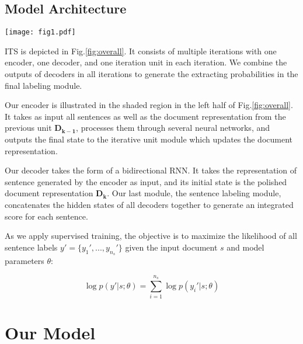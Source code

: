\documentclass[11pt,a4paper]{article}
\begin{document}
\subsection{Model Architecture}

\begin{figure*}
	\setlength{\abovecaptionskip}{0.cm}
	
	\setlength{\belowcaptionskip}{-0.cm}
	\texttt{[image: fig1.pdf]}
	\caption{\label{fig:overall} Model Structure: There is one encoder, one decoder and one iterative unit  (which is used to polish document representation) in each iteration. The final labeling part is used to generating the extracting probabilities for all sentences combining hidden states of decoders in all iterations. We take a document consists of three sentences for example here. }
\end{figure*}

ITS is depicted in Fig.\ref{fig:overall}. It consists of multiple iterations with one encoder, one decoder, and one iteration unit in each iteration. We combine the outputs of decoders in all iterations to generate the extracting probabilities in the final labeling module.

Our encoder is illustrated in the shaded region in the left half of Fig.\ref{fig:overall}. It takes as input all sentences as well as the document representation from the previous unit $\bm{D_{k-1}}$, processes them through several neural networks, and outputs the final state to the iterative unit module which updates the document representation. 

Our decoder takes the form of a bidirectional RNN. It takes the representation of sentence generated by the encoder as input, and its initial state is the polished document representation $\bm{D_{k}}$. 
Our last module, the sentence labeling module, concatenates the hidden states of all decoders together to generate an integrated score for each sentence.

As we apply supervised training, the objective is to maximize the likelihood of all sentence labels $y'=\{y_{1}',...,y_{n_{s}}'\}$ given the input document $s$ and model parameters $\theta$:


\begin{equation}
\log p(y'|s;\theta)=\sum_{i=1}^{n_s}{\log p(y_{i}'|s;\theta)}
\end{equation}


\section{Our Model}
\end{document}

